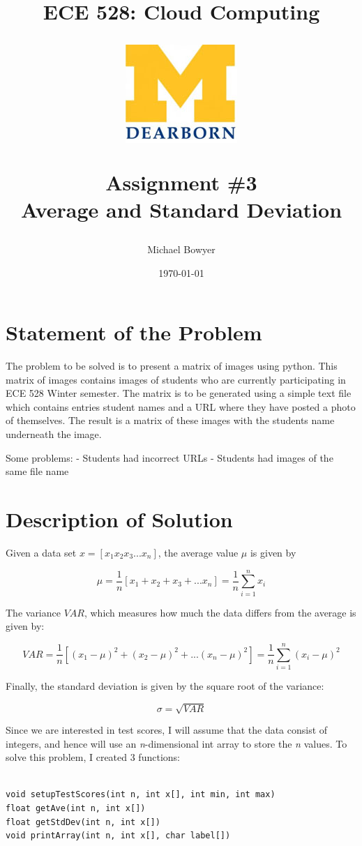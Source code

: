 \documentclass[12pt, letterpaper, final, onecolumn, titlepage] {article}
\title{ECE 528: Cloud Computing \\
	\vspace{1.5cm}
   		\begin{center}\includegraphics{umlogo} \end{center}
	\vspace{1.5cm}
	\textbf{Assignment \#3} \\
Average and Standard Deviation}
\author{Michael Bowyer}
\date{\today}
\begin{document}
\maketitle

\doublespacing

\section{Statement of the Problem}

The problem to be solved is to present a matrix of images using python. This matrix of images contains images of students who are currently participating in ECE 528 Winter semester. The matrix is to be generated using a simple text file which contains entries student names and a URL where they have posted a photo of themselves. The result is a matrix of these images with the students name underneath the image. 

Some problems:
- Students had incorrect URLs
- Students had images of the same file name

\section{Description of Solution}

Given a data set \( x = [x_1 x_2 x_3 ... x_n]\), the average value \( \mu \) is given by

\[
	\mu = \frac{1}{n}[x_1 + x_2 + x_3 + ... x_n] = \frac{1}{n}\sum_{i=1}^n x_i
\]

The variance \( VAR \), which measures how much the data differs from the average is given by:

\[
	VAR = \frac{1}{n}[(x_1-\mu)^2 + (x_2-\mu)^2 + ... (x_n-\mu)^2] = \frac{1}{n}\sum_{i=1}^n (x_i-\mu)^2
\]

Finally, the standard deviation is given by the square root of the variance:

\[
	\sigma = \sqrt{VAR}
\]

Since we are interested in test scores, I will assume that the data consist of integers, and hence will use an \textit{n}-dimensional int array to store the \textit{n} values. To solve this problem, I created 3 functions:

\singlespacing
\begin{lstlisting}

void setupTestScores(int n, int x[], int min, int max)
float getAve(int n, int x[])
float getStdDev(int n, int x[])
void printArray(int n, int x[], char label[])

\end{lstlisting}
\doublespacing
\end{document}

